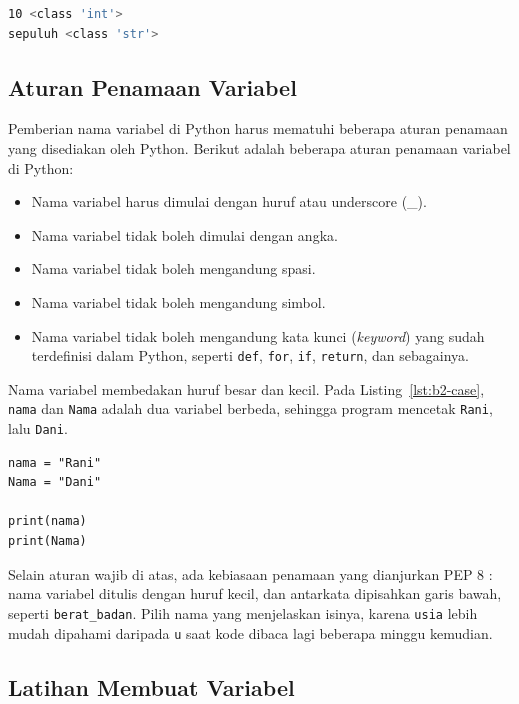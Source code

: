 \begin{lstlisting}[language=bash, caption={Keluaran tipe_dinamis.py}, label={lst:b2-dynamic-out}]
10 <class 'int'>
sepuluh <class 'str'>
\end{lstlisting}

\subsection{Aturan Penamaan Variabel}

Pemberian nama variabel di Python harus mematuhi beberapa aturan penamaan yang disediakan oleh Python. Berikut adalah beberapa aturan penamaan variabel di Python:

\begin{itemize}
	\item Nama variabel harus dimulai dengan huruf atau underscore (\_).
	\item Nama variabel tidak boleh dimulai dengan angka.
	\item Nama variabel tidak boleh mengandung spasi.
	\item Nama variabel tidak boleh mengandung simbol.
	\item Nama variabel tidak boleh mengandung kata kunci (\textit{keyword}) yang sudah terdefinisi dalam Python, seperti \texttt{def}, \texttt{for}, \texttt{if}, \texttt{return}, dan sebagainya.
\end{itemize}

Nama variabel membedakan huruf besar dan kecil. Pada Listing~\ref{lst:b2-case}, \texttt{nama} dan \texttt{Nama} adalah dua variabel berbeda, sehingga program mencetak \texttt{Rani}, lalu \texttt{Dani}.

\begin{lstlisting}[style=PythonStyle, caption={Kode Python: huruf_besar_kecil.py}, label={lst:b2-case}]
nama = "Rani"
Nama = "Dani"

print(nama)
print(Nama)
\end{lstlisting}

Selain aturan wajib di atas, ada kebiasaan penamaan yang dianjurkan PEP 8 \cite{pep8}: nama variabel ditulis dengan huruf kecil, dan antarkata dipisahkan garis bawah, seperti \texttt{berat_badan}. Pilih nama yang menjelaskan isinya, karena \texttt{usia} lebih mudah dipahami daripada \texttt{u} saat kode dibaca lagi beberapa minggu kemudian.

\subsection{Latihan Membuat Variabel}

